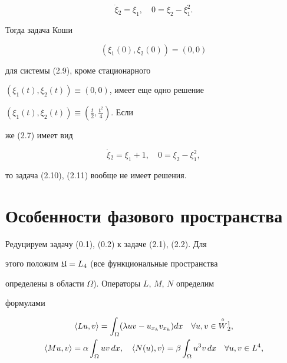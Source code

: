 \begin{equation}


\Dot\xi{}_{2}=\xi_{1},\quad 0=\xi_{2}-\xi^{2}_{1}.


\end{equation}


Тогда задача Коши


\begin{equation}


(\xi_{1}(0),\xi_{2}(0))=(0,0)


\end{equation}


для системы (2.9), кроме стационарного


$(\xi_{1}(t),\xi_{2}(t))\equiv(0,0)$, имеет еще одно решение


$(\xi_{1}(t),\xi_{2}(t))\equiv(\frac{t}{2},\frac{t^{2}}{4})$. Если


же (2.7) имеет вид


\begin{equation}


\Dot\xi{}_{2}=\xi_{1}+1,\quad 0=\xi_{2}-\xi^{2}_{1},


\end{equation}


то задача (2.10), (2.11) вообще не имеет решения.








\section{Особенности фазового пространства}





Редуцируем задачу (0.1), (0.2) к задаче (2.1), (2.2). Для


этого положим $\frak U=L_{4}$ (все функциональные пространства


определены в области $\Omega$). Операторы $L$, $M$, $N$ определим


формулами


\begin{gather*}


\la Lu,v\ra=\int_{\Omega}(\lambda uv-u_{x_{k}}v_{x_{k}})dx \quad\forall


u,v\in \overset{\circ}{W}{}^{1}_{2}, \\


%


\la Mu,v\ra=\alpha\int_{\Omega}uv\,dx,\quad


\la N(u),v\ra=\beta\int_{\Omega}u^{3}v\,dx \quad\forall u,v\in  L^{4},


\end{gather*}



